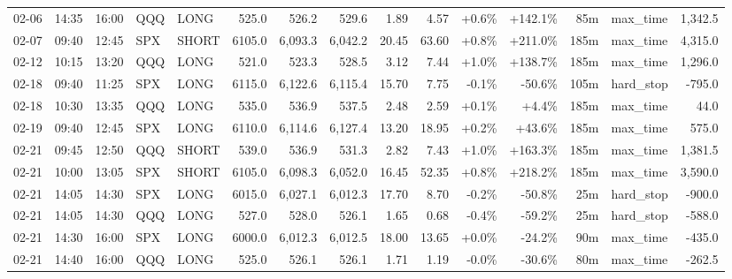 \documentclass[11pt,a4paper,twoside]{article}
\begin{document}
\begin{landscape}
\begin{center}
\begin{longtable}{>{\color{txtmain}}l l l l l r r r r r r r r >{\color{txtmain}}l r}
02-06 & 14:35 & 16:00 & QQQ & LONG & 525.0 & 526.2 & 529.6 & 1.89 & 4.57 & \textcolor{wingreen}{+0.6\%} & \textcolor{wingreen}{+142.1\%} & 85m & max\_time & \textcolor{wingreen}{1,342.5} \\
02-07 & 09:40 & 12:45 & SPX & SHORT & 6105.0 & 6,093.3 & 6,042.2 & 20.45 & 63.60 & \textcolor{wingreen}{+0.8\%} & \textcolor{wingreen}{+211.0\%} & 185m & max\_time & \textcolor{wingreen}{4,315.0} \\
02-12 & 10:15 & 13:20 & QQQ & LONG & 521.0 & 523.3 & 528.5 & 3.12 & 7.44 & \textcolor{wingreen}{+1.0\%} & \textcolor{wingreen}{+138.7\%} & 185m & max\_time & \textcolor{wingreen}{1,296.0} \\
02-18 & 09:40 & 11:25 & SPX & LONG & 6115.0 & 6,122.6 & 6,115.4 & 15.70 & 7.75 & \textcolor{lossred}{-0.1\%} & \textcolor{lossred}{-50.6\%} & 105m & hard\_stop & \textcolor{lossred}{-795.0} \\
02-18 & 10:30 & 13:35 & QQQ & LONG & 535.0 & 536.9 & 537.5 & 2.48 & 2.59 & \textcolor{wingreen}{+0.1\%} & \textcolor{wingreen}{+4.4\%} & 185m & max\_time & \textcolor{wingreen}{44.0} \\
02-19 & 09:40 & 12:45 & SPX & LONG & 6110.0 & 6,114.6 & 6,127.4 & 13.20 & 18.95 & \textcolor{wingreen}{+0.2\%} & \textcolor{wingreen}{+43.6\%} & 185m & max\_time & \textcolor{wingreen}{575.0} \\
02-21 & 09:45 & 12:50 & QQQ & SHORT & 539.0 & 536.9 & 531.3 & 2.82 & 7.43 & \textcolor{wingreen}{+1.0\%} & \textcolor{wingreen}{+163.3\%} & 185m & max\_time & \textcolor{wingreen}{1,381.5} \\
02-21 & 10:00 & 13:05 & SPX & SHORT & 6105.0 & 6,098.3 & 6,052.0 & 16.45 & 52.35 & \textcolor{wingreen}{+0.8\%} & \textcolor{wingreen}{+218.2\%} & 185m & max\_time & \textcolor{wingreen}{3,590.0} \\
02-21 & 14:05 & 14:30 & SPX & LONG & 6015.0 & 6,027.1 & 6,012.3 & 17.70 & 8.70 & \textcolor{lossred}{-0.2\%} & \textcolor{lossred}{-50.8\%} & 25m & hard\_stop & \textcolor{lossred}{-900.0} \\
02-21 & 14:05 & 14:30 & QQQ & LONG & 527.0 & 528.0 & 526.1 & 1.65 & 0.68 & \textcolor{lossred}{-0.4\%} & \textcolor{lossred}{-59.2\%} & 25m & hard\_stop & \textcolor{lossred}{-588.0} \\
02-21 & 14:30 & 16:00 & SPX & LONG & 6000.0 & 6,012.3 & 6,012.5 & 18.00 & 13.65 & \textcolor{wingreen}{+0.0\%} & \textcolor{lossred}{-24.2\%} & 90m & max\_time & \textcolor{lossred}{-435.0} \\
02-21 & 14:40 & 16:00 & QQQ & LONG & 525.0 & 526.1 & 526.1 & 1.71 & 1.19 & \textcolor{lossred}{-0.0\%} & \textcolor{lossred}{-30.6\%} & 80m & max\_time & \textcolor{lossred}{-262.5} \\

\end{longtable}
\end{center}
\end{landscape}
\end{document}
